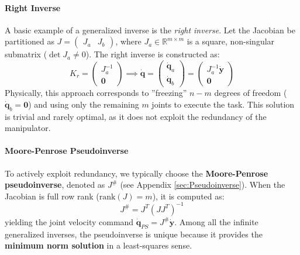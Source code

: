 \paragraph{Right Inverse}
A basic example of a generalized inverse is the \textit{right inverse}. Let the Jacobian be partitioned as $J = \begin{pmatrix} J_a & J_b \end{pmatrix}$, where $J_a \in \mathbb{R}^{m \times m}$ is a square, non-singular submatrix ($\det J_a \neq 0$). The right inverse is constructed as:
\begin{equation}
    K_r = \begin{pmatrix} J_a^{-1} \\ \mathbf{0} \end{pmatrix} \implies \dot{\mathbf{q}} = \begin{pmatrix} \dot{\mathbf{q}}_a \\ \dot{\mathbf{q}}_b \end{pmatrix} = \begin{pmatrix} J_a^{-1}\dot{\mathbf{y}} \\ \mathbf{0} \end{pmatrix}
\end{equation}
Physically, this approach corresponds to ''freezing'' $n-m$ degrees of freedom ($\dot{\mathbf{q}}_b = \mathbf{0}$) and using only the remaining $m$ joints to execute the task. This solution is trivial and rarely optimal, as it does not exploit the redundancy of the manipulator.

\paragraph{Moore-Penrose Pseudoinverse}
To actively exploit redundancy, we typically choose the \textbf{Moore-Penrose pseudoinverse}, denoted as $J^\#$ (see Appendix \ref{sec:Pseudoinverse}). 
When the Jacobian is full row rank ($\text{rank}(J) = m$), it is computed as:
\begin{equation}
    J^\# = J^T(JJ^T)^{-1}
\end{equation}
yielding the joint velocity command $\dot{\mathbf{q}}_{PS} = J^\#\dot{\mathbf{y}}$. 
Among all the infinite generalized inverses, the pseudoinverse is unique because it provides the \textbf{minimum norm solution} in a least-squares sense. 

